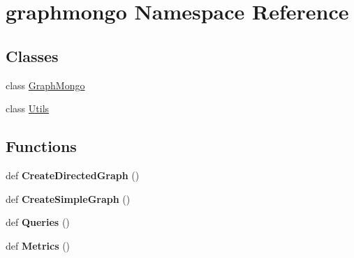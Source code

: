 \hypertarget{namespacegraphmongo}{}\section{graphmongo Namespace Reference}
\label{namespacegraphmongo}
\subsection*{Classes}
\begin{DoxyCompactItemize}
\item 
class \hyperlink{classgraphmongo_1_1GraphMongo}{Graph\+Mongo}
\item 
class \hyperlink{classgraphmongo_1_1Utils}{Utils}
\end{DoxyCompactItemize}
\subsection*{Functions}
\begin{DoxyCompactItemize}
\item 
\hypertarget{namespacegraphmongo_a08837102d173acb3c80042dc53517e65}{}\label{namespacegraphmongo_a08837102d173acb3c80042dc53517e65} 
def {\bfseries Create\+Directed\+Graph} ()
\item 
\hypertarget{namespacegraphmongo_a39d1a2193f488c1724349e94c03f3aa1}{}\label{namespacegraphmongo_a39d1a2193f488c1724349e94c03f3aa1} 
def {\bfseries Create\+Simple\+Graph} ()
\item 
\hypertarget{namespacegraphmongo_a06974d1b9d1cf06218a4c34f94673e35}{}\label{namespacegraphmongo_a06974d1b9d1cf06218a4c34f94673e35} 
def {\bfseries Queries} ()
\item 
\hypertarget{namespacegraphmongo_aa9d9dfae9ff7c04f02610f4877f82c69}{}\label{namespacegraphmongo_aa9d9dfae9ff7c04f02610f4877f82c69} 
def {\bfseries Metrics} ()
\end{DoxyCompactItemize}
